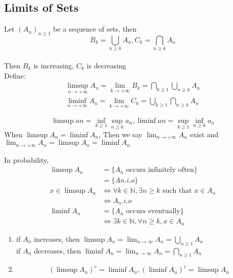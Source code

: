 \subsection{Limits of Sets}
\begin{definition}{}
Let $(A_n)_{n \geq 1}$ be a sequence of sets, then
$$
    B_k=\bigcup_{n \geq k}A_n, C_k=\bigcap_{n \geq k}A_n
$$ 
\\Then $ B_k $ is increasing, $ C_k $ is decreasing
\\Define:
\begin{align*}
    \limsup_{n \rightarrow +\infty}A_n=\lim_{k \rightarrow +\infty}B_k=\bigcap_{k\geq 1}\bigcup_{n\geq k}A_n
\\\liminf_{n \rightarrow +\infty}A_n=\lim_{k \rightarrow +\infty}C_k=\bigcup_{k\geq 1}\bigcap_{n\geq k}A_n
\end{align*} 
\end{definition}
\begin{definition}{}
$$
    \limsup{an}=\inf_{k\geq 1}\sup_{n\geq k}a_n, \liminf{an}=\sup_{k\geq 1}\inf_{n\geq k}a_n
$$ 
When $ \limsup{A_n}=\liminf{A_n} $, Then we say $ \lim_{n \rightarrow +\infty}{A_n} $ exist
and $ \lim_{n \rightarrow +\infty}{A_n}=\limsup{A_n}=\liminf{A_n} $  
\end{definition}
In probability,
\begin{align*}{}{}
\limsup{A_n}&=\{A_n\text{ occurs infinitely often}\}
\\&= \{An.i.o\}
\\x \in \limsup{A_n}&\Leftrightarrow \forall k \in \mathbb{N}, \exists n \geq k \text{ such that } x \in A_n
\\&\Leftrightarrow A_n.i.o
\\\liminf{A_n}&=\{A_n\text{ occurs eventually}\}
\\&\Leftrightarrow \exists k \in \mathbb{N}, \forall n \geq k, x \in A_n
\end{align*}
\begin{remark}{}{}
\begin{enumerate}
    \item if $ A_n $ increases, then $ \limsup{A_n}=\lim_{n \rightarrow \infty}{A_n}=\bigcup_{n\geq1}{A_n}$
    \\if $ A_n $ decreases, then $ \liminf{A_n}=\lim_{n \rightarrow \infty}{A_n}=\bigcap_{n\geq1}{A_n}$
    \item $$
        {(\limsup{A_n})}^c=\liminf{A_n}, {(\liminf{A_n})}^c=\limsup{A_n}
    $$  
\end{enumerate}
\end{remark}
